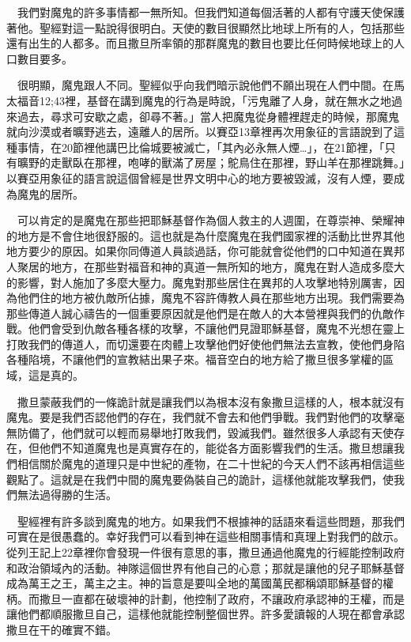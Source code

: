 \documentclass{book}
\begin{document}
　我們對魔鬼的許多事情都一無所知。但我們知道每個活著的人都有守護天使保護著他。聖經對這一點說得很明白。天使的數目很顯然比地球上所有的人，包括那些還有出生的人都多。而且撒旦所率領的那群魔鬼的數目也要比任何時候地球上的人口數目要多。

　很明顯，魔鬼跟人不同。聖經似乎向我們暗示說他們不願出現在人們中間。在馬太福音12;43裡，基督在講到魔鬼的行為是時說，「污鬼離了人身，就在無水之地過來過去，尋求可安歇之處，卻尋不著。」當人把魔鬼從身體裡趕走的時候，那魔鬼就向沙漠或者曠野逃去，遠離人的居所。以賽亞13章裡再次用象征的言語說到了這種事情，在20節裡他講巴比倫城要被滅亡，「其內必永無人煙…」，在21節裡，「只有曠野的走獸臥在那裡，咆哮的獸滿了房屋；鴕鳥住在那裡，野山羊在那裡跳舞。」以賽亞用象征的語言說這個曾經是世界文明中心的地方要被毀滅，沒有人煙，要成為魔鬼的居所。

　可以肯定的是魔鬼在那些把耶穌基督作為個人救主的人週圍，在尊崇神、榮耀神的地方是不會住地很舒服的。這也就是為什麼魔鬼在我們國家裡的活動比世界其他地方要少的原因。如果你同傳道人員談過話，你可能就會從他們的口中知道在異邦人聚居的地方，在那些對福音和神的真道一無所知的地方，魔鬼在對人造成多麼大的影響，對人施加了多麼大壓力。魔鬼對那些居住在異邦的人攻擊地特別厲害，因為他們住的地方被仇敵所佔據，魔鬼不容許傳教人員在那些地方出現。我們需要為那些傳道人誠心禱告的一個重要原因就是他們是在敵人的大本營裡與我們的仇敵作戰。他們會受到仇敵各種各樣的攻擊，不讓他們見證耶穌基督，魔鬼不光想在靈上打敗我們的傳道人，而切還要在肉體上攻擊他們好使他們無法去宣教，使他們身陷各種陷境，不讓他們的宣教結出果子來。福音空白的地方給了撒旦很多掌權的區域，這是真的。

　撒旦蒙蔽我們的一條詭計就是讓我們以為根本沒有象撒旦這樣的人，根本就沒有魔鬼。要是我們否認他們的存在，我們就不會去和他們爭戰。我們對他們的攻擊毫無防備了，他們就可以輕而易舉地打敗我們，毀滅我們。雖然很多人承認有天使存在，但他們不知道魔鬼也是真實存在的，能從各方面影響我們的生活。撒旦想讓我們相信關於魔鬼的道理只是中世紀的產物，在二十世紀的今天人們不該再相信這些觀點了。這就是在我們中間的魔鬼要偽裝自己的詭計，這樣他就能攻擊我們，使我們無法過得勝的生活。

　聖經裡有許多談到魔鬼的地方。如果我們不根據神的話語來看這些問題，那我們可實在是很愚蠢的。幸好我們可以看到神在這些相關事情和真理上對我們的啟示。從列王記上22章裡你會發現一件很有意思的事，撒旦通過他魔鬼的行經能控制政府和政治領域內的活動。神隊這個世界有他自己的心意；那就是讓他的兒子耶穌基督成為萬王之王，萬主之主。神的旨意是要叫全地的萬國萬民都稱頌耶穌基督的權柄。而撒旦一直都在破壞神的計劃，他控制了政府，不讓政府承認神的王權，而是讓他們都順服撒旦自己，這樣他就能控制整個世界。許多愛讀報的人現在都會承認撒旦在干的確實不錯。
\end{document}
